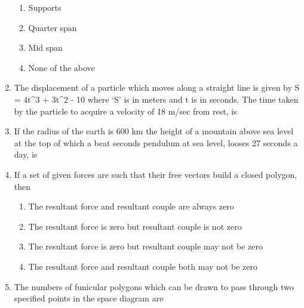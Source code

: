 \documentclass[11pt,a4paper]{article}
\begin{document}
\begin{enumerate}
\begin{enumerate}[label=\Alph*.]
\item{Supports}
\item{Quarter span}
\item{Mid span}
\item{None of the above}
\end{enumerate}
\item{The displacement of a particle which moves along a straight line is given by S = 4t\^{}3 + 3t\^{}2 - 10 where `S' is in meters and t is in seconds. The time taken by the particle to acquire a velocity of 18 m/sec from rest, is
}
\\
\item{If the radius of the earth is 600 km the height of a mountain above sea level at the top of which a beat seconds pendulum at sea level, looses 27 seconds a day, is}
\\
\item{If a set of given forces are such that their free vectors build a closed polygon, then}
\begin{enumerate}[label=\Alph*.]
\item{The resultant force and resultant couple are always zero}
\item{The resultant force is zero but resultant couple is not zero}
\item{The resultant force is zero but resultant couple may not be zero}
\item{The resultant force and resultant couple both may not be zero}
\end{enumerate}
\item{The numbers of funicular polygons which can be drawn to pass through two specified points in the space diagram are}
\\\begin{enumerate*}[itemjoin=\qquad, label=\Alph*.]

\end{enumerate*}
\end{enumerate}
\end{document}
